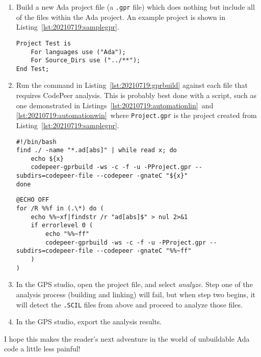 \begin{enumerate}
	\item Build a new Ada project file (a \texttt{.gpr} file) which does nothing but include all of the files within the Ada project. An example project is shown in Listing~\ref{lst:20210719:samplegpr}.
\begin{lstlisting}[caption={All-Inclusive GPR Example},captionpos=b,style=AdaStyle,basicstyle=\small,label={lst:20210719:samplegpr},literate=*{-}{-}1,breaklines=true,upquote=true]
Project Test is
	For languages use ("Ada");
	For Source_Dirs use ("../**");
End Test;
\end{lstlisting}
	\item Run the command in Listing~\ref{lst:20210719:gprbuild} against each file that requires CodePeer analysis. This is probably best done with a script, such as one demonstrated in Listings~\ref{lst:20210719:automationlin}\ and \ref{lst:20210719:automationwin}\ where \texttt{Project.gpr} is the project created from Listing~\ref{lst:20210719:samplegpr}.
\begin{lstlisting}[caption={Bash Script for Ada Single-Build Automation},captionpos=b,style=BashStyle,basicstyle=\small,label={lst:20210719:automationlin},literate=*{-}{-}1
{"}{"}1,breaklines=true]
#!/bin/bash
find ./ -name "*.ad[abs]" | while read x; do
	echo ${x}
	codepeer-gprbuild -ws -c -f -u -PProject.gpr --subdirs=codepeer-file --codepeer -gnateC "${x}"
done
\end{lstlisting}
\begin{lstlisting}[caption={Batch Script for Ada Single-Build Automation},captionpos=b,style=BashStyle,basicstyle=\small,label={lst:20210719:automationwin},literate=*{-}{-}1
{"}{"}1,breaklines=true]
@ECHO OFF
for /R %%f in (.\*) do (
	echo %%~xf|findstr /r "ad[abs]$" > nul 2>&1
	if errorlevel 0 (
		echo "%%~ff"
		codepeer-gprbuild -ws -c -f -u -PProject.gpr --subdirs=codepeer-file --codepeer -gnateC "%%~ff"
	)
)
\end{lstlisting}
	\item In the GPS studio, open the project file, and select \textit{analyze}.  Step one of the analysis process (building and linking) will fail, but when step two begins, it will detect the \texttt{.SCIL} files from above and proceed to analyze those files.
	\item In the GPS studio, export the analysis results.
\end{enumerate}

I hope this makes the reader’s next adventure in the world of unbuildable Ada code a little less painful!

